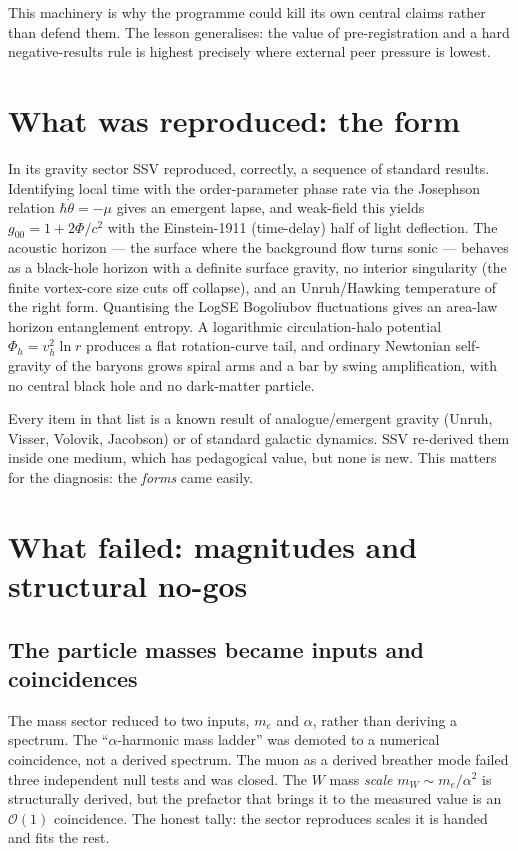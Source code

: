\documentclass[11pt]{article}
\begin{document}
\noindent This machinery is why the programme could kill its own central claims
rather than defend them. The lesson generalises: the value of pre-registration
and a hard negative-results rule is highest precisely where external peer
pressure is lowest.

\section{What was reproduced: the form}

In its gravity sector SSV reproduced, correctly, a sequence of standard results.
Identifying local time with the order-parameter phase rate via the Josephson
relation $\hbar\dot\theta=-\mu$ gives an emergent lapse, and weak-field this
yields $g_{00}=1+2\Phi/c^2$ with the Einstein-1911 (time-delay) half of light
deflection. The acoustic horizon --- the surface where the background flow turns
sonic --- behaves as a black-hole horizon with a definite surface gravity, no
interior singularity (the finite vortex-core size cuts off collapse), and an
Unruh/Hawking temperature of the right form. Quantising the LogSE Bogoliubov
fluctuations gives an area-law horizon entanglement entropy. A logarithmic
circulation-halo potential $\Phi_h=v_h^2\ln r$ produces a flat rotation-curve
tail, and ordinary Newtonian self-gravity of the baryons grows spiral arms and a
bar by swing amplification, with no central black hole and no dark-matter
particle.

Every item in that list is a known result of analogue/emergent gravity
(Unruh, Visser, Volovik, Jacobson) or of standard galactic dynamics. SSV
re-derived them inside one medium, which has pedagogical value, but none is new.
This matters for the diagnosis: the \emph{forms} came easily.

\section{What failed: magnitudes and structural no-gos}

\subsection{The particle masses became inputs and coincidences}

The mass sector reduced to two inputs, $m_e$ and $\alpha$, rather than deriving a
spectrum. The ``$\alpha$-harmonic mass ladder'' was demoted to a numerical
coincidence, not a derived spectrum. The muon as a derived breather mode failed
three independent null tests and was closed. The $W$ mass \emph{scale}
$m_W\sim m_e/\alpha^2$ is structurally derived, but the prefactor that brings it
to the measured value is an $\mathcal{O}(1)$ coincidence. The honest tally: the
sector reproduces scales it is handed and fits the rest.
\end{document}
